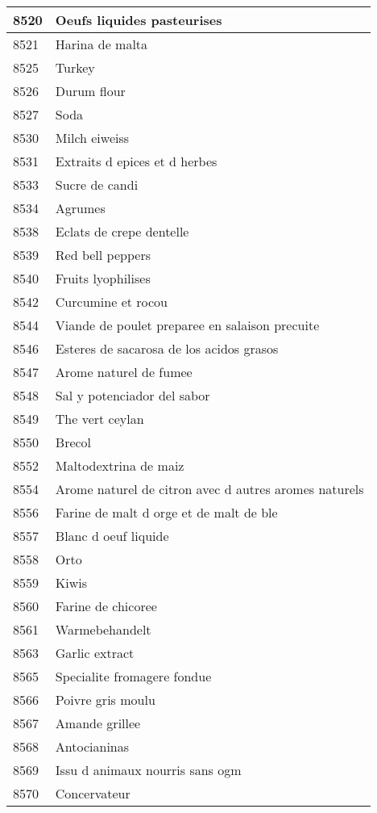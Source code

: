 \begin{longtable}{|l|l|}
8520 & Oeufs liquides pasteurises \\ \hline 
8521 & Harina de malta \\ \hline 
8525 & Turkey \\ \hline 
8526 & Durum flour \\ \hline 
8527 & Soda \\ \hline 
8530 & Milch eiweiss \\ \hline 
8531 & Extraits d epices et d herbes \\ \hline 
8533 & Sucre de candi \\ \hline 
8534 & Agrumes \\ \hline 
8538 & Eclats de crepe dentelle \\ \hline 
8539 & Red bell peppers \\ \hline 
8540 & Fruits lyophilises \\ \hline 
8542 & Curcumine et rocou \\ \hline 
8544 & Viande de poulet preparee en salaison precuite \\ \hline 
8546 & Esteres de sacarosa de los acidos grasos \\ \hline 
8547 & Arome naturel de fumee \\ \hline 
8548 & Sal y potenciador del sabor \\ \hline 
8549 & The vert ceylan \\ \hline 
8550 & Brecol \\ \hline 
8552 & Maltodextrina de maiz \\ \hline 
8554 & Arome naturel de citron avec d autres aromes naturels \\ \hline 
8556 & Farine de malt d orge et de malt de ble \\ \hline 
8557 & Blanc d oeuf liquide \\ \hline 
8558 & Orto \\ \hline 
8559 & Kiwis \\ \hline 
8560 & Farine de chicoree \\ \hline 
8561 & Warmebehandelt \\ \hline 
8563 & Garlic extract \\ \hline 
8565 & Specialite fromagere fondue \\ \hline 
8566 & Poivre gris moulu \\ \hline 
8567 & Amande grillee \\ \hline 
8568 & Antocianinas \\ \hline 
8569 & Issu d animaux nourris sans ogm \\ \hline 
8570 & Concervateur \\ \hline 

\end{longtable}

